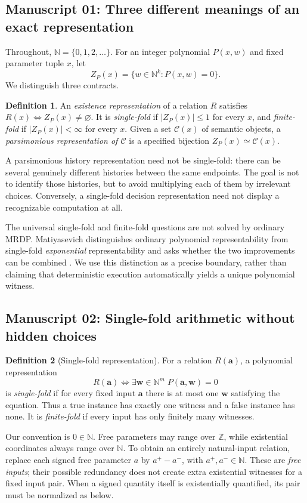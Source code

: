 \documentclass[11pt,a4paper]{article}
\theoremstyle{definition}
\newtheorem{definition}[definition]{Definition}
\theoremstyle{remark}
\newcommand{\N}{\mathbb N}
\newcommand{\Z}{\mathbb Z}
\begin{document}
\subsection{Manuscript 01: Three different meanings of an exact representation}
Throughout, $\N=\{0,1,2,\ldots\}$. For an integer polynomial $P(x,w)$ and fixed parameter tuple $x$, let
\[
 Z_P(x)=\{w\in\N^k:P(x,w)=0\}.
\]
We distinguish three contracts.
\begin{definition}
An \emph{existence representation} of a relation $R$ satisfies
$R(x)\iff Z_P(x)\ne\varnothing$.
It is \emph{single-fold} if $|Z_P(x)|\le1$ for every $x$, and \emph{finite-fold} if $|Z_P(x)|<\infty$ for every $x$.
Given a set $\mathcal C(x)$ of semantic objects, a \emph{parsimonious representation of $\mathcal C$} is a specified bijection
$Z_P(x)\simeq\mathcal C(x)$.
\end{definition}
A parsimonious history representation need not be single-fold: there can be several genuinely different histories between the same endpoints. The goal is not to identify those histories, but to avoid multiplying each of them by irrelevant choices. Conversely, a single-fold decision representation need not display a recognizable computation at all.

The universal single-fold and finite-fold questions are not solved by ordinary MRDP. Matiyasevich distinguishes ordinary polynomial representability from single-fold \emph{exponential} representability and asks whether the two improvements can be combined \cite{mat2010}. We use this distinction as a precise boundary, rather than claiming that deterministic execution automatically yields a unique polynomial witness.


\subsection{Manuscript 02: Single-fold arithmetic without hidden choices}
\label{cdc:pt:sec:arithmetic}

\begin{definition}[Single-fold representation]
For a relation $R(\boldsymbol a)$, a polynomial representation
\[
 R(\boldsymbol a)\iff
 \exists\boldsymbol w\in\N^m\;P(\boldsymbol a,\boldsymbol w)=0
\]
is \emph{single-fold} if for every fixed input $\boldsymbol a$ there is at
most one $\boldsymbol w$ satisfying the equation. Thus a true instance has
exactly one witness and a false instance has none. It is \emph{finite-fold}
if every input has only finitely many witnesses.
\end{definition}
Our convention is $0\in\N$. Free parameters may range over $\Z$, while
existential coordinates always range over $\N$. To obtain an entirely
natural-input relation, replace each signed free parameter $a$ by
$a^+-a^-$, with $a^+,a^-\in\N$. These are \emph{free inputs}; their
possible redundancy does not create extra existential witnesses for a fixed
input pair. When a signed quantity itself is existentially quantified, its
pair must be normalized as below.
\end{document}
